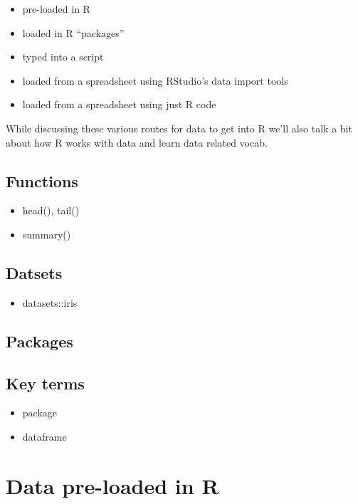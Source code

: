 \documentclass[]{book}
\providecommand{\tightlist}{%
  \setlength{\itemsep}{0pt}\setlength{\parskip}{0pt}}
\theoremstyle{definition}
\theoremstyle{definition}
\theoremstyle{definition}
\theoremstyle{remark}
\begin{document}
\begin{itemize}
\tightlist
\item
  pre-loaded in R
\item
  loaded in R ``packages''
\item
  typed into a script
\item
  loaded from a spreadsheet using RStudio's data import tools
\item
  loaded from a spreadsheet using just R code
\end{itemize}

While discussing these various routes for data to get into R we'll also
talk a bit about how R works with data and learn data related vocab.

\subsection{Functions}\label{functions}

\begin{itemize}
\tightlist
\item
  head(), tail()
\item
  summary()
\end{itemize}

\subsection{Datsets}\label{datsets}

\begin{itemize}
\tightlist
\item
  datasets::iris
\end{itemize}

\subsection{Packages}\label{packages-1}

\subsection{Key terms}\label{key-terms}

\begin{itemize}
\tightlist
\item
  package
\item
  dataframe
\end{itemize}

\section{Data pre-loaded in R}\label{data-pre-loaded-in-r}
\end{document}

